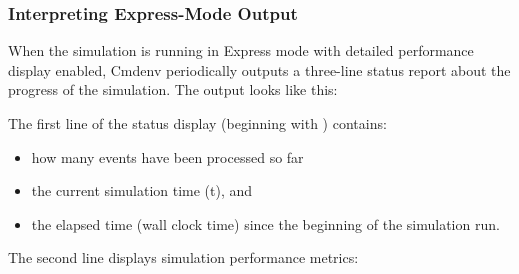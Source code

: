 \subsubsection{Interpreting Express-Mode Output}

When the simulation is running in Express mode with detailed
performance display enabled, Cmdenv periodically outputs a three-line
status report about the progress of the simulation.
The output looks like this:


The first line of the status display (beginning with \ttt{**})
contains:

\begin{itemize}
   \item how many events have been processed so far
   \item the current simulation time (t), and
   \item the elapsed time (wall clock time) since the beginning of the simulation run.
\end{itemize}

The second line displays simulation performance metrics:

